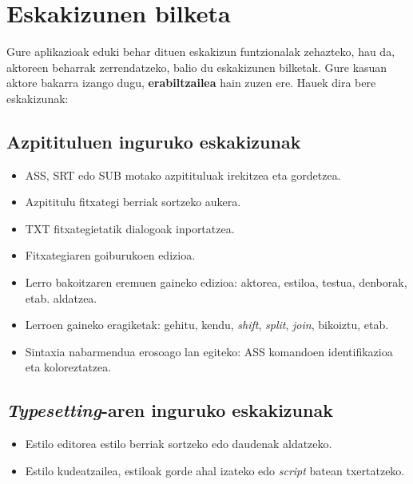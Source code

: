 
\section{Eskakizunen bilketa}
Gure aplikazioak eduki behar dituen eskakizun funtzionalak zehazteko, hau da, aktoreen beharrak zerrendatzeko, balio du eskakizunen bilketak. Gure kasuan aktore bakarra izango dugu, \textbf{erabiltzailea} hain zuzen ere. Hauek dira bere eskakizunak:
\subsection{Azpitituluen inguruko eskakizunak}
\begin{itemize}
\item ASS, SRT edo SUB motako azpitituluak irekitzea eta gordetzea.
\item Azpititulu fitxategi berriak sortzeko aukera.
\item TXT fitxategietatik dialogoak inportatzea.
\item Fitxategiaren goiburukoen edizioa.
\item Lerro bakoitzaren eremuen gaineko edizioa: aktorea, estiloa, testua, denborak, etab. aldatzea.
\item Lerroen gaineko eragiketak: gehitu, kendu, \textit{shift}, \textit{split}, \textit{join}, bikoiztu, etab.
\item Sintaxia nabarmendua erosoago lan egiteko: ASS komandoen identifikazioa eta koloreztatzea.
\end{itemize}
\subsection{\textit{Typesetting}-aren inguruko eskakizunak}
\begin{itemize}
\item Estilo editorea estilo berriak sortzeko edo daudenak aldatzeko.
\item Estilo kudeatzailea, estiloak gorde ahal izateko edo \textit{script} batean txertatzeko.
\end{itemize}
